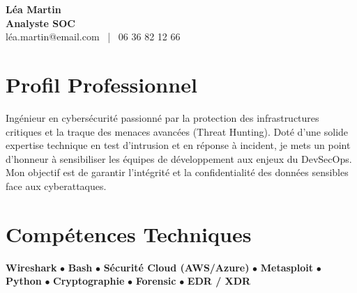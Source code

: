 \documentclass[11pt,a4paper]{article}
\begin{document}
\begin{center}
    {\Huge \textbf{Léa Martin}} \\[0.2cm]
    {\Large \textbf{Analyste SOC}} \\[0.1cm]
    léa.martin@email.com \ | \ 06 36 82 12 66
\end{center}

\vspace{0.3cm}

\section*{Profil Professionnel}
\noindent
Ingénieur en cybersécurité passionné par la protection des infrastructures critiques et la traque des menaces avancées (Threat Hunting). Doté d'une solide expertise technique en test d'intrusion et en réponse à incident, je mets un point d'honneur à sensibiliser les équipes de développement aux enjeux du DevSecOps. Mon objectif est de garantir l'intégrité et la confidentialité des données sensibles face aux cyberattaques.

\vspace{0.3cm}

\section*{Compétences Techniques}
\noindent
\textbf{Wireshark} $\bullet$ \textbf{Bash} $\bullet$ \textbf{Sécurité Cloud (AWS/Azure)} $\bullet$ \textbf{Metasploit} $\bullet$ \textbf{Python} $\bullet$ \textbf{Cryptographie} $\bullet$ \textbf{Forensic} $\bullet$ \textbf{EDR / XDR}

\vspace{0.3cm}

\end{document}
